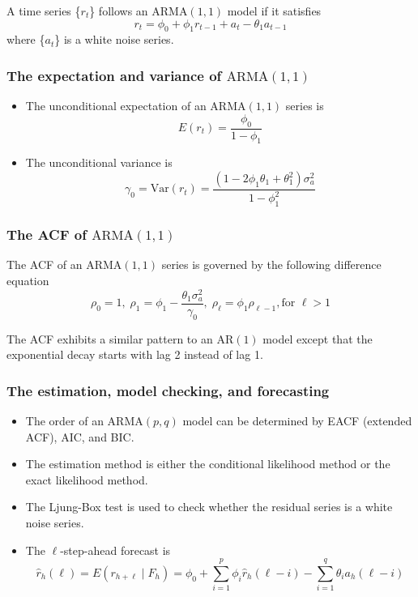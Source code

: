 \documentclass[a4paper,11pt]{article}
\newcommand{\var}{\mathrm{Var}}
\begin{document}
A time series \{\(r_t\)\} follows an \(\mathrm{ARMA}(1,1)\) model if it
satisfies
\begin{equation}
\label{eq-arma11}
r_t = \phi_0 + \phi_1 r_{t-1} + a_t - \theta_1 a_{t-1}
\end{equation}
where \{\(a_t\)\} is a white noise series.

\subsubsection*{The expectation and variance of \(\mathrm{ARMA}(1,1)\)}
\label{sec:org6985de6}

\begin{itemize}
\item The unconditional expectation of an \(\mathrm{ARMA}(1, 1)\) series is
\[E(r_t) = \frac{\phi_0}{1 - \phi_1}\]

\item The unconditional variance is
\[ \gamma_0 = \var(r_t) = \frac{(1-2\phi_1 \theta_1 + \theta_1^2) \sigma^2_a}{1-\phi_1^2} \]
\end{itemize}

\subsubsection*{The ACF of \(\mathrm{ARMA}(1,1)\)}
\label{sec:org8e5480d}

The ACF of an \(\mathrm{ARMA}(1,1)\) series is governed by the following
difference equation
\[ \rho_0 = 1,\; \rho_1 = \phi_1 - \frac{\theta_1
\sigma^2_a}{\gamma_0},\; \rho_{\ell} = \phi_1 \rho_{\ell-1}, \text{
for } \ell>1 \]

The ACF exhibits a similar pattern to an \(\mathrm{AR}(1)\) model except
that the exponential decay starts with lag 2 instead of lag 1.

\subsubsection*{The estimation, model checking, and forecasting}
\label{sec:orgffd1bdb}

\begin{itemize}
\item The order of an \(\mathrm{ARMA}(p,q)\) model can be determined by EACF
(extended ACF), AIC, and BIC.
\item The estimation method is either the conditional likelihood method or
the exact likelihood method.
\item The Ljung-Box test is used to check whether the residual series is a
white noise series.
\item The \(\ell\)-step-ahead forecast is
\[ \hat{r}_h(\ell) = E(r_{h+\ell} \mid F_h) = \phi_0 + \sum_{i=1}^p
  \phi_i \hat{r}_h(\ell-i) - \sum_{i=1}^q \theta_i a_h(\ell-i) \]
\end{itemize}
\end{document}
